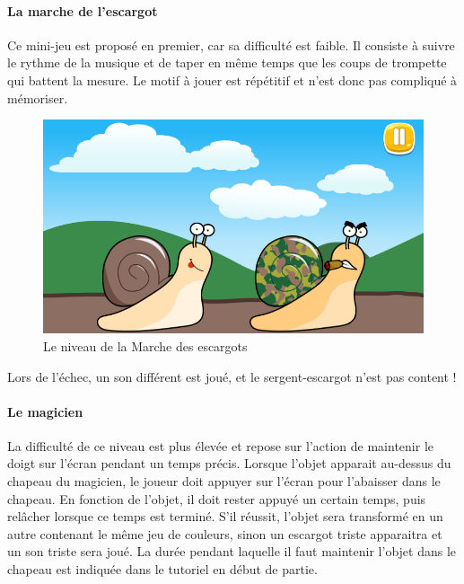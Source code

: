 \paragraph{La marche de l'escargot}

Ce mini-jeu est proposé en premier, car sa difficulté est faible. Il consiste à suivre le rythme de la musique et de taper en même temps que les coups de trompette qui battent la mesure. Le motif à jouer est répétitif et n'est donc pas compliqué à mémoriser.

\begin{figure}[H]\centering
  \includegraphics[scale=0.4]{./img/resultat_escargot.png}
  \caption{Le niveau de la Marche des escargots}
  \label{niveau_escargot}
\end{figure}

Lors de l'échec, un son différent est joué, et le sergent-escargot n'est pas content !


\paragraph{Le magicien}

La difficulté de ce niveau est plus élevée et repose sur l'action de maintenir le doigt sur l'écran pendant un temps précis. Lorsque l'objet apparait au-dessus du chapeau du magicien, le joueur doit appuyer sur l'écran pour l'abaisser dans le chapeau. En fonction de l'objet, il doit rester appuyé un certain temps, puis relâcher lorsque ce temps est terminé. S'il réussit, l'objet sera transformé en un autre contenant le même jeu de couleurs, sinon un escargot triste apparaitra et un son triste sera joué. La durée pendant laquelle il faut maintenir l'objet dans le chapeau est indiquée dans le tutoriel en début de partie.

